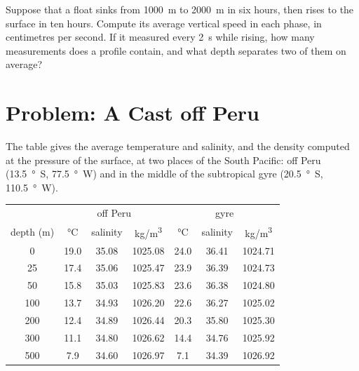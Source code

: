 \begin{exercise}[$\star\star\star$]\label{exo:g10:layered-ocean:15}
Suppose that a float sinks from \qty{1000}{m} to \qty{2000}{m} in six
hours, then rises to the surface in ten hours. Compute its average vertical speed
in each phase, in centimetres per second. If it measured every \qty{2}{s} while
rising, how many measurements does a profile contain, and
what depth separates two of them on average?
\end{exercise}

\section{Problem: A Cast off Peru}

\begin{problem}
\label{pb:g10:layered-ocean:1}
The table gives the average temperature and salinity, and the density
computed at the pressure of the surface, at two places of the South Pacific:
off Peru (\qty{13.5}{\degree S}, \qty{77.5}{\degree W}) and in the middle of
the subtropical gyre (\qty{20.5}{\degree S}, \qty{110.5}{\degree W}).

\begin{center}
\small
\begin{tabular}{c|ccc|ccc}
\hline
 & \multicolumn{3}{c|}{off Peru} & \multicolumn{3}{c}{gyre} \\
depth (\unit{m}) & \unit{\degreeCelsius} & salinity & \unit{kg/m^3} & \unit{\degreeCelsius} & salinity & \unit{kg/m^3} \\
\hline
0 & 19.0 & 35.08 & 1025.08 & 24.0 & 36.41 & 1024.71 \\
25 & 17.4 & 35.06 & 1025.47 & 23.9 & 36.39 & 1024.73 \\
50 & 15.8 & 35.03 & 1025.83 & 23.6 & 36.38 & 1024.80 \\
100 & 13.7 & 34.93 & 1026.20 & 22.6 & 36.27 & 1025.02 \\
200 & 12.4 & 34.89 & 1026.44 & 20.3 & 35.80 & 1025.30 \\
300 & 11.1 & 34.80 & 1026.62 & 14.4 & 34.76 & 1025.92 \\
500 & 7.9 & 34.60 & 1026.97 & 7.1 & 34.39 & 1026.92 \\
\hline
\end{tabular}
\end{center}


\end{problem}
